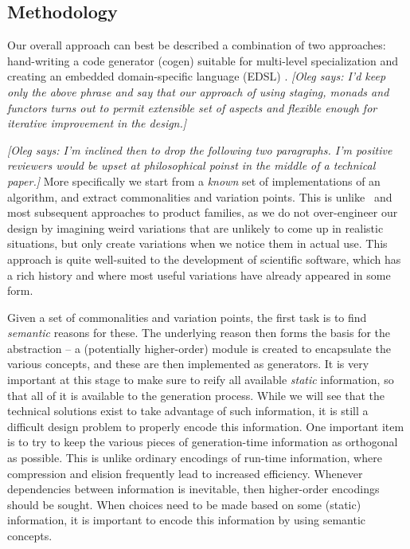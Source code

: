 \documentclass[draft]{elsart}
\newcommand{\oleg}[1]{{\it [Oleg says: #1]}}
\begin{document}
\subsection{Methodology}

Our overall approach can best be described a combination 
of two approaches: hand-writing a code generator (cogen) suitable
for multi-level specialization \cite{Gluck95,GluckJ97} and creating
an embedded domain-specific language (EDSL) \cite{edsl,WhenHowDSL}.
\oleg{I'd keep only the above phrase and say that our approach of
  using staging, monads and functors turns out to permit extensible
  set of aspects and flexible enough for iterative improvement in the
  design.}

\oleg{I'm inclined then to drop the following two paragraphs. I'm
  positive reviewers would be upset at philosophical poinst in the
  middle of a technical paper.}
More specifically we start from a \emph{known} set of implementations
of an algorithm, and extract commonalities and variation points.
This is unlike~\cite{journals/tse/Parnas76} and most subsequent
approaches to product families, as we do not over-engineer our design
by imagining weird variations that are unlikely to come up in realistic
situations, but only create variations when we notice them in actual use.
This approach is quite well-suited to the development of scientific
software, which has a rich history and where most useful variations have
already appeared in some form.

Given a set of commonalities and variation points, the first task is to
find \emph{semantic} reasons for these.  The underlying reason then
forms the basis for the abstraction -- a (potentially higher-order)
module is created to encapsulate the various concepts, and these are
then implemented as generators.  It is very important at this stage to
make sure to reify all available \emph{static} information, so that all
of it is available to the generation process.  While we will see that
the technical solutions exist to take advantage of such information,
it is still a difficult design problem to properly encode this information.
One important item is to try to keep the various pieces of generation-time
information as orthogonal as possible.  This is unlike ordinary encodings
of run-time information, where compression and elision frequently lead
to increased efficiency.  Whenever dependencies between information is
inevitable, then higher-order encodings should be sought.  When choices
need to be made based on some (static) information, it is important to
encode this information by using semantic concepts.
\end{document}
